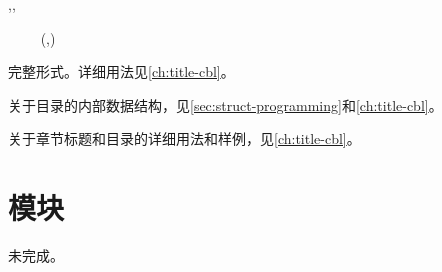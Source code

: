 \documentclass{whudoc}
\begin{document}
\begin{function}{\SetSpecifiedCombinedListStyle,\SpecifiedCombinedList,
  \LocalSpecifiedCombinedList}
  \begin{syntax}
    \V\SetSpecifiedCombinedListStyle {} 
    ~~~~    
    \V\SpecifiedCombinedList {}
    \V\LocalSpecifiedCombinedList {}
    \V\LocalSpecifiedCombinedList {} \string(,\string)
  \end{syntax}
完整形式。详细用法见\cref{ch:title-cbl}。
\end{function}

关于目录的内部数据结构，见\cref{sec:struct-programming}和\cref{ch:title-cbl}。

关于章节标题和目录的详细用法和样例，见\cref{ch:title-cbl}。

\section{模块}
未完成。\TODO 





\end{document}
